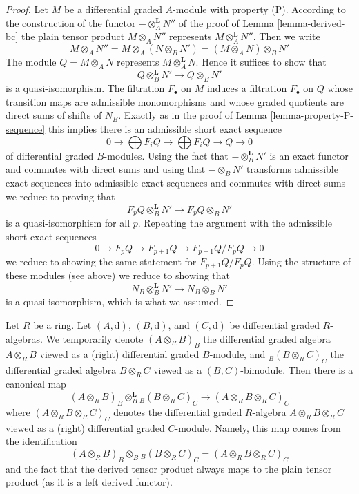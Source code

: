 \begin{proof}
Let $M$ be a differential graded $A$-module with property (P).
According to the construction of the functor $- \otimes_A^\mathbf{L} N''$
of the proof of Lemma \ref{lemma-derived-bc} the plain tensor
product $M \otimes_A N''$ represents $M \otimes_A^\mathbf{L} N''$.
Then we write
$$
M \otimes_A N'' =
M \otimes_A (N \otimes_B N') =
(M \otimes_A N) \otimes_B N'
$$
The module $Q = M \otimes_A N$ represents $M \otimes_A^\mathbf{L} N$.
Hence it suffices to show that
$$
Q \otimes_B^\mathbf{L} N' \longrightarrow Q \otimes_B N'
$$
is a quasi-isomorphism. The filtration $F_\bullet$ on $M$ induces a
filtration $F_\bullet$ on $Q$ whose transition maps are admissible
monomorphisms and whose graded quotients are direct sums of shifts of $N_B$.
Exactly as in the proof of Lemma \ref{lemma-property-P-sequence}
this implies there is an admissible short exact sequence
$$
0 \to
\bigoplus\nolimits F_iQ \to
\bigoplus\nolimits F_iQ \to Q \to 0
$$
of differential graded $B$-modules. Using the fact that
$- \otimes_B^\mathbf{L} N'$ is an exact functor and commutes
with direct sums and using that $- \otimes_B N'$ transforms
admissible exact sequences into admissible exact sequences
and commutes with direct sums we reduce to proving
that
$$
F_pQ \otimes_B^\mathbf{L} N' \longrightarrow F_pQ \otimes_B N'
$$
is a quasi-isomorphism for all $p$. Repeating the argument
with the admissible short exact sequences
$$
0 \to F_pQ \to F_{p + 1}Q \to F_{p + 1}Q/F_pQ \to 0
$$
we reduce to showing the same statement for $F_{p + 1}Q/F_pQ$.
Using the structure of these modules (see above) we reduce to
showing that
$$
N_B \otimes_B^\mathbf{L} N' \longrightarrow N_B \otimes_B N'
$$
is a quasi-isomorphism, which is what we assumed.
\end{proof}

\noindent
Let $R$ be a ring. Let $(A, \text{d})$, $(B, \text{d})$, and
$(C, \text{d})$ be differential graded $R$-algebras.
We temporarily denote $(A \otimes_R B)_B$ the differential
graded algebra $A \otimes_R B$ viewed as a (right) differential
graded $B$-module, and ${}_B(B \otimes_R C)_C$ the differential
graded algebra $B \otimes_R C$ viewed as a $(B, C)$-bimodule.
Then there is a canonical map
\begin{equation}
\label{equation-plain-versus-derived-algebras}
(A \otimes_R B)_B \otimes_B^\mathbf{L} {}_B(B \otimes_R C)_C
\longrightarrow
(A \otimes_R B \otimes_R C)_C
\end{equation}
where $(A \otimes_R B \otimes_R C)_C$ denotes the differential
graded $R$-algebra $A \otimes_R B \otimes_R C$ viewed as a
(right) differential graded $C$-module. Namely, this map
comes from the identification
$$
(A \otimes_R B)_B \otimes_B {}_B(B \otimes_R C)_C =
(A \otimes_R B \otimes_R C)_C
$$
and the fact that the derived tensor product always maps to the
plain tensor product (as it is a left derived functor).

